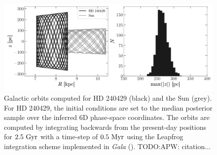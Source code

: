 \documentclass[manuscript]{aastex6}
\newcommand{\project}[1]{\textsl{#1}}
\newcommand*\elem[1]{\ensuremath{\mathrm{#1}}}
\newcommand{\todo}[1]{{\color{blue}TODO:#1}}
\begin{document}
\begin{figure}[htbp]
  \begin{center}
    \includegraphics[width=\linewidth]{orbits.pdf}
  \end{center}
  \caption{%
    Galactic orbits computed for HD 240429 (black) and the Sun (grey).
    For HD 240429, the initial conditions are set to the median posterior
    sample over the inferred 6D phase-space coordinates.
    The orbits are computed by integrating backwards from the present-day
    positions for $2.5~{\rm Gyr}$ with a time-step of $0.5~{\rm Myr}$ using the
    Leapfrog integration scheme implemented in \project{Gala}
    (\citealt{Gala:2017}). \todo{APW: citation...}
\label{fig:orbit}}
\end{figure}

\end{document}

